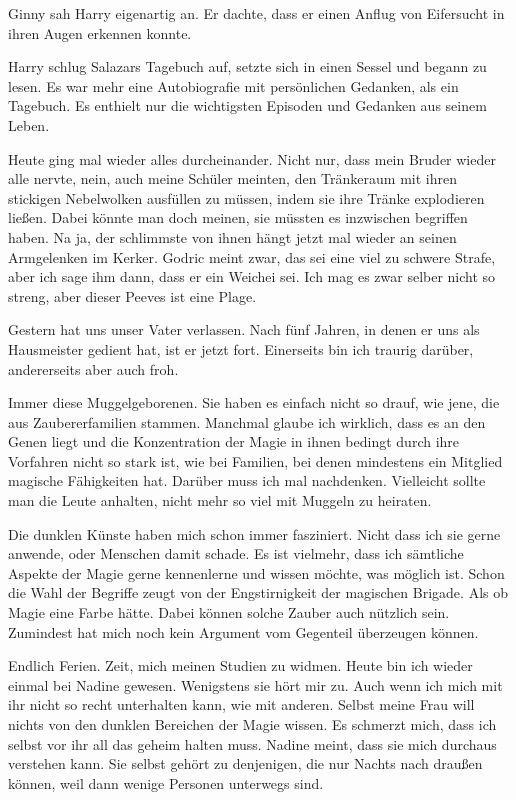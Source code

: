 Ginny sah Harry eigenartig an. Er dachte, dass er einen Anflug von Eifersucht in ihren Augen erkennen konnte.

\trenn

Harry schlug Salazars Tagebuch auf, setzte sich in einen Sessel und begann zu lesen. Es war mehr eine Autobiografie mit persönlichen Gedanken, als ein Tagebuch. Es enthielt nur die wichtigsten Episoden und Gedanken aus seinem Leben.

\begin{buch}
Heute ging mal wieder alles durcheinander. Nicht nur, dass mein Bruder wieder alle nervte, nein, auch meine Schüler meinten, den Tränkeraum mit ihren stickigen Nebelwolken ausfüllen zu müssen, indem sie ihre Tränke explodieren ließen. Dabei könnte man doch meinen, sie müssten es inzwischen begriffen haben. Na ja, der schlimmste von ihnen hängt jetzt mal wieder an seinen Armgelenken im Kerker. Godric meint zwar, das sei eine viel zu schwere Strafe, aber ich sage ihm dann, dass er ein Weichei sei. Ich mag es zwar selber nicht so streng, aber dieser Peeves ist eine Plage.

Gestern hat uns unser Vater verlassen. Nach fünf Jahren, in denen er uns als Hausmeister gedient hat, ist er jetzt fort. Einerseits bin ich traurig darüber, andererseits aber auch froh.

Immer diese Muggelgeborenen. Sie haben es einfach nicht so drauf, wie jene, die aus Zaubererfamilien stammen. Manchmal glaube ich wirklich, dass es an den Genen liegt und die Konzentration der Magie in ihnen bedingt durch ihre Vorfahren nicht so stark ist, wie bei Familien, bei denen mindestens ein Mitglied magische Fähigkeiten hat. Darüber muss ich mal nachdenken. Vielleicht sollte man die Leute anhalten, nicht mehr so viel mit Muggeln zu heiraten.

Die dunklen Künste haben mich schon immer fasziniert. Nicht dass ich sie gerne anwende, oder Menschen damit schade. Es ist vielmehr, dass ich sämtliche Aspekte der Magie gerne kennenlerne und wissen möchte, was möglich ist. Schon die Wahl der Begriffe zeugt von der Engstirnigkeit der magischen Brigade. Als ob Magie eine Farbe hätte. Dabei können solche Zauber auch nützlich sein. Zumindest hat mich noch kein Argument vom Gegenteil überzeugen können.

Endlich Ferien. Zeit, mich meinen Studien zu widmen. Heute bin ich wieder einmal bei Nadine gewesen. Wenigstens sie hört mir zu. Auch wenn ich mich mit ihr nicht so recht unterhalten kann, wie mit anderen. Selbst meine Frau will nichts von den dunklen Bereichen der Magie wissen. Es schmerzt mich, dass ich selbst vor ihr all das geheim halten muss. Nadine meint, dass sie mich durchaus verstehen kann. Sie selbst gehört zu denjenigen, die nur Nachts nach draußen können, weil dann wenige Personen unterwegs sind.


\end{buch}
